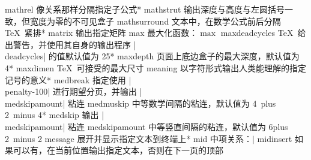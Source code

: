 \capcs mathrel {像关系那样分隔指定子公式}*{}
\capcs mathstrut {输出深度与高度与左圆括号一致，但宽度为零的不可见盒子}{}{}
\capcs mathsurround {文本中，在数学公式前后分隔 \TeX\ 紧排}*{}
\capcs matrix {输出指定矩阵}{}{}
\capcs max {最大化函数：$\max$}{}{}
\capcs maxdeadcycles {\TeX\ 给出警告，并使用其自身的输出程序 |\\deadcycles| 的值默认值为 25}*{}
\capcs maxdepth {页面上底边盒子的最大深度，默认值为 4\pt}*{}
\capcs maxdimen {\TeX\ 可接受的最大尺寸}{}{}
\capcs meaning {以字符形式输出人类能理解的指定记号的意义}*{}
\capcs medbreak {指定使用 |\\penalty-100| 进行期望分页，并输出 |\\medskipamount| 粘连}{}{}
\capcs medmuskip {中等数学间隔的粘连，默认值为 4\mud\ plus 2\mud\ minus 4\mud}*{}
\capcs medskip {输出 |\\medskipamount| 粘连}{}{}
\capcs medskipamount {中等竖直间隔的粘连，默认值为 6\pt plus 2\pt\ minus 2\pt}{}{}
\capcs message {展开并显示指定文本到终端上}*{}
\capcs mid {中项关系：$\mid$}{}{}
\capcs midinsert {如果可以有，在当前位置输出指定文本，否则在下一页的顶部}{}{}
